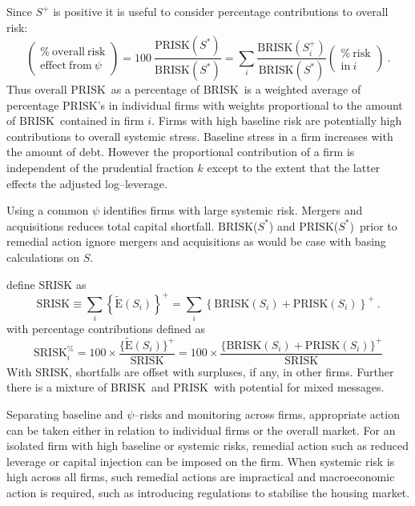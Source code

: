 \documentclass[authoryear]{elsarticle}
\newcommand{\E}{{\mathrm E}}
\newcommand{\be}[1]{\begin{equation}\label{#1}}
\newcommand{\ee}{\end{equation}}
\newcommand{\br}{\ensuremath{\mathrm{BRISK}}}
\newcommand{\pr}{\ensuremath{\mathrm{PRISK}}}
\begin{document}
Since $S^+$ is positive it is useful to consider percentage contributions to overall risk:
\begin{equation}\label{total2}
\left(\begin{array}{c}\%\ \mathrm{overall\ risk}\\ \mathrm{effect\ from}\ \psi\end{array}\right) = 100\ \frac{\pr(S^*)}{\br(S^*)}= \sum_i \frac{\br(S_i^+)}{\br(S^*)} \left(\begin{array}{c}\%\ \mathrm{risk}\\\mathrm{in }\ i \end{array}\right)\ .
\end{equation}
Thus overall \pr\  as a percentage of \br\   is  a weighted average of percentage \pr 's  in individual firms with weights   proportional to the amount of \br\  contained in firm $i$.  Firms with high baseline risk are potentially high contributions to overall systemic stress.    Baseline stress in a firm increases with the amount of debt.   However the proportional contribution of a firm is independent of the prudential fraction $k$ except to the extent that the latter effects the adjusted log--leverage.

Using a common $\psi$ identifies firms with large systemic risk.  Mergers and acquisitions reduces total capital shortfall. \br($S^*$)  and \pr($S^*$)\  prior to remedial action  ignore mergers and acquisitions as would be case with basing calculations on $S$.

 
\cite{brownlees2015} define SRISK as 
\be{srisk}
\mathrm{SRISK} \equiv \sum_i\left\{\widetilde\E(S_i)\right\}^+=\sum_i\left\{\br(S_i)+\pr(S_i)\right\}^+\ .
\ee
with percentage contributions defined as 
$$
\mathrm{SRISK}_i^\% = 100\times\frac{\{\widetilde\E(S_i)\}^+}{\mathrm{SRISK}}= 100\times \frac{\{\br(S_i)+\pr(S_i)\}^+}{\mathrm{SRISK}}
$$
With SRISK,  shortfalls are  offset with surpluses, if any, in other firms.   
Further there is a mixture of \br\  and \pr\  with potential for mixed messages.

Separating  baseline and $\psi$--risks and monitoring  across firms, appropriate action can be taken either in relation to individual firms or the overall market. For an isolated firm with high baseline or systemic risks, remedial action such as reduced leverage or capital injection can be imposed on the firm. When systemic risk is high across all firms, such remedial actions are impractical and macroeconomic action is required, such as introducing regulations to stabilise the housing market.
\end{document}
